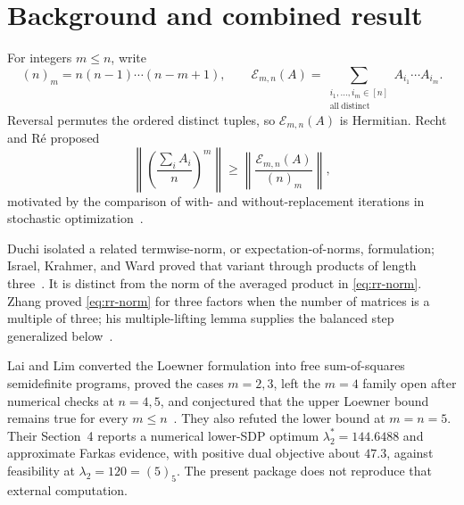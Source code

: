 \documentclass[11pt]{article}
\newcommand{\E}{\mathcal E}
\newcommand{\fall}[2]{(#1)_{#2}}
\begin{document}
\begin{center}
\end{center}

\section{Background and combined result}\label{sec:background}

For integers \(m\le n\), write
\[
 \fall nm=n(n-1)\cdots(n-m+1),\qquad
 \E_{m,n}(A)=
 \sum_{\substack{i_1,\ldots,i_m\in[n]\\\mathrm{all\ distinct}}}
 A_{i_1}\cdots A_{i_m}.
\]
Reversal permutes the ordered distinct tuples, so \(\E_{m,n}(A)\) is Hermitian.  Recht and R\'e proposed
\begin{equation}\label{eq:rr-norm}
 \left\|\left(\frac{\sum_iA_i}{n}\right)^m\right\|
 \ge
 \left\|\frac{\E_{m,n}(A)}{\fall nm}\right\|,
\end{equation}
motivated by the comparison of with- and without-replacement iterations in stochastic optimization~\cite{RechtRe2012}.

Duchi isolated a related termwise-norm, or expectation-of-norms, formulation; Israel, Krahmer, and Ward proved that variant through products of length three~\cite{Duchi2012,IsraelKrahmerWard2016}.  It is distinct from the norm of the averaged product in \eqref{eq:rr-norm}.  Zhang proved \eqref{eq:rr-norm} for three factors when the number of matrices is a multiple of three; his multiple-lifting lemma supplies the balanced step generalized below~\cite{Zhang2018}.

Lai and Lim converted the Loewner formulation into free sum-of-squares semidefinite programs, proved the cases \(m=2,3\), left the \(m=4\) family open after numerical checks at \(n=4,5\), and conjectured that the upper Loewner bound remains true for every \(m\le n\)~\cite{LaiLim2020}.  They also refuted the lower bound at \(m=n=5\).  Their Section~4 reports a numerical lower-SDP optimum
\(\lambda_2^\ast=144.6488\) and approximate Farkas evidence, with positive dual objective about \(47.3\), against feasibility at
\(\lambda_2=120=\fall55\).  The present package does not reproduce that external computation.
\end{document}
